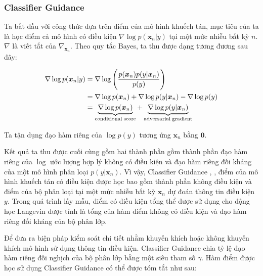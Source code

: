 \documentclass[14pt, a4paper]{article}
\numberwithin{equation}{section}
\numberwithin{figure}{section}
\numberwithin{dl}{section}
\numberwithin{md}{section}
\numberwithin{bd}{section}
\numberwithin{dn}{section}
\numberwithin{hq}{section}
\begin{document}
    \subsubsection{Classifier Guidance}

    Ta bắt đầu với công thức dựa trên điểm của mô hình khuếch tán, mục tiêu của ta là học điểm cả mô hình có điều kiện $\nabla \log p (\boldsymbol{x}_n \vert y)$ tại một mức nhiễu bất kỳ $n$.
    $\nabla$ là viết tắt của $\nabla_{\boldsymbol{x}_n}$.
    Theo quy tắc Bayes, ta thu được dạng tương đương sau đây:

    \begin{equation} \label{eq:Classifier-Guidance-Score}
        \begin{aligned}
            \nabla \log p(\boldsymbol{x}_n \vert y) &= \nabla \log \Bigg( \dfrac{p(\boldsymbol{x}_n)p(y \vert \boldsymbol{x}_n)}{p(y)} \Bigg) \\
            &= \nabla \log p(\boldsymbol{x}_n) + \nabla \log p(y \vert \boldsymbol{x}_n) - \nabla \log p(y) \\
            &= \underbrace{\nabla \log p(\boldsymbol{x}_n)}_{\mathrm{conditional \thickspace score}} + \underbrace{\nabla \log p(y \vert \boldsymbol{x}_n)}_{\mathrm{adversarial \thickspace gradient}}
        \end{aligned}
    \end{equation}

    Ta tận dụng đạo hàm riêng của $\log p(y)$ tương ứng $\boldsymbol{x}_n$ bằng $\boldsymbol{0}$.

    Kết quả ta thu được cuối cùng gồm hai thành phần gồm thành phần đạo hàm riêng của $\log$ ước lượng hợp lý không có điều kiện và đạo hàm riêng đối kháng của một mô hình phân loại $p(y \vert \boldsymbol{x}_n)$.
    Vì vậy, Classifier Guidance \cite{song2020score}, \cite{dhariwal2021diffusion}, điểm của mô hình khuếch tán có điều kiện được học bao gồm thành phần không điều kiện và điểm của bộ phân loại tại một mức nhiễu bất kỳ $\boldsymbol{x}_n$ dự đoán thông tin điều kiện $y$.
    Trong quá trình lấy mẫu, điểm có điều kiện tổng thể được sử dụng cho động học Langevin được tính là tổng của hàm điểm không có điều kiện và đạo hàm riêng đối kháng của bộ phân lớp.

    Để đưa ra biện pháp kiểm soát chi tiết nhằm khuyến khích hoặc không khuyến khích mô hình sử dụng thông tin điều kiện.
    Classifier Guidance chia tỷ lệ đạo hàm riêng đối nghịch của bộ phân lớp bằng một siêu tham số $\gamma$.
    Hàm điểm được học sử dụng Classifier Guidance có thể được tóm tắt như sau:
\end{document}
